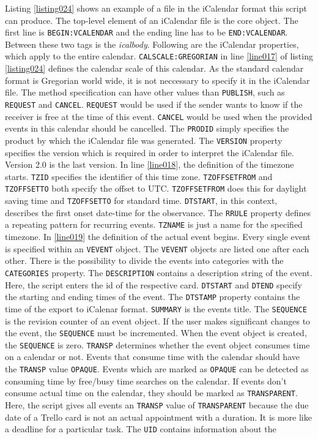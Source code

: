 Listing \ref{listing024} shows an example of a file in the iCalendar format this script can produce. The top-level element of an iCalendar file is the core object. The first line is \lstinline{BEGIN:VCALENDAR} and the ending line has to be \lstinline{END:VCALENDAR}. Between these two tags is the \emph{icalbody}. Following are the iCalendar properties, which apply to the entire calendar. \lstinline{CALSCALE:GREGORIAN} in line \ref{line017} of listing \ref{listing024} defines the calendar scale of this calendar. As the standard calendar format is Gregorian world wide, it is not neccessary to specify it in the iCalendar file. The method specification can have other values than \lstinline{PUBLISH}, such as \lstinline{REQUEST} and \lstinline{CANCEL}. \lstinline{REQUEST} would be used if the sender wants to know if the receiver is free at the time of this event. \lstinline{CANCEL} would be used when the provided events in this calendar should be cancelled. The \lstinline{PRODID} simply specifies the product by which the iCalendar file was generated. The \lstinline{VERSION} property specifies the version which is required in order to interpret the iCalendar file. Version 2.0 is the last version. In line \ref{line018}, the definition of the timezone starts. \lstinline{TZID} specifies the identifier of this time zone. \lstinline{TZOFFSETFROM} and \lstinline{TZOFFSETTO} both specify the offset to UTC. \lstinline{TZOFFSETFROM} does this for daylight saving time and \lstinline{TZOFFSETTO} for standard time. \lstinline{DTSTART}, in this context, describes the first onset date-time for the observance. The \lstinline{RRULE} property defines a repeating pattern for recurring events. \lstinline{TZNAME} is just a name for the specified timezone. In \ref{line019} the definition of the actual event begins. Every single event is specified within an \lstinline{VEVENT} object. The \lstinline{VEVENT} objects are listed one after each other. There is the possibility to divide the events into categories with the \lstinline{CATEGORIES} property. The \lstinline{DESCRIPTION} contains a description string of the event. Here, the script enters the id of the respective card. \lstinline{DTSTART} and \lstinline{DTEND} specify the starting and ending times of the event. The \lstinline{DTSTAMP} property contains the time of the export to iCalenar format. \lstinline{SUMMARY} is the events title. The \lstinline{SEQUENCE} is the revision counter of an event object. If the user makes significant changes to the event, the \lstinline{SEQUENCE} must be incremented. When the event object is created, the \lstinline{SEQUENCE} is zero. \lstinline{TRANSP} determines whether the event object consumes time on a calendar or not. Events that consume time with the calendar should have the \lstinline{TRANSP} value \lstinline{OPAQUE}. Events which are marked as \lstinline{OPAQUE} can be detected as consuming time by free/busy time searches on the calendar. If events don't consume actual time on the calendar, they should be marked as \lstinline{TRANSPARENT}. Here, the script gives all events an \lstinline{TRANSP} value of \lstinline{TRANSPARENT} because the due date of a Trello card is not an actual appointment with a duration. It is more like a deadline for a particular task. The \lstinline{UID} contains information about the 